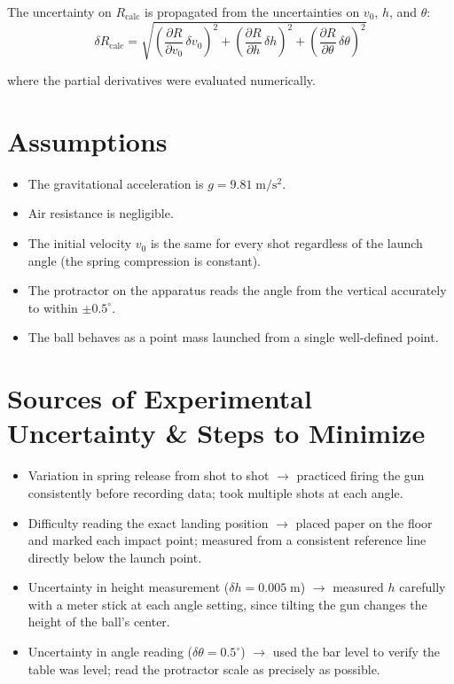 \documentclass[12pt]{article}
\begin{document}
The uncertainty on $R_{\mathrm{calc}}$ is propagated from the uncertainties on $v_0$, $h$, and $\theta$:
\[
    \delta R_{\mathrm{calc}} = \sqrt{\left(\frac{\partial R}{\partial v_0}\,\delta v_0\right)^2 + \left(\frac{\partial R}{\partial h}\,\delta h\right)^2 + \left(\frac{\partial R}{\partial \theta}\,\delta \theta\right)^2}
\]

where the partial derivatives were evaluated numerically.

\section*{Assumptions}
\begin{itemize}[nosep]
    \item The gravitational acceleration is $g = 9.81\;\mathrm{m/s^2}$.
    \item Air resistance is negligible.
    \item The initial velocity $v_0$ is the same for every shot regardless of the launch angle (the spring compression is constant).
    \item The protractor on the apparatus reads the angle from the vertical accurately to within $\pm 0.5^\circ$.
    \item The ball behaves as a point mass launched from a single well-defined point.
\end{itemize}

\section*{Sources of Experimental Uncertainty \& Steps to Minimize}
\begin{itemize}[nosep]
    \item Variation in spring release from shot to shot $\rightarrow$ practiced firing the gun consistently before recording data; took multiple shots at each angle.
    \item Difficulty reading the exact landing position $\rightarrow$ placed paper on the floor and marked each impact point; measured from a consistent reference line directly below the launch point.
    \item Uncertainty in height measurement ($\delta h = 0.005\;\mathrm{m}$) $\rightarrow$ measured $h$ carefully with a meter stick at each angle setting, since tilting the gun changes the height of the ball's center.
    \item Uncertainty in angle reading ($\delta\theta = 0.5^\circ$) $\rightarrow$ used the bar level to verify the table was level; read the protractor scale as precisely as possible.
\end{itemize}
\end{document}
